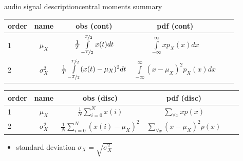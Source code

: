 \begin{frame}{audio signal description}{central moments summary}
\begin{footnotesize}
 \begin{table}
     \centering
         \begin{tabular}{lccccc}
             order & name & obs (cont) & pdf (cont) & \\\hline
            1 & $\mu_X$ & $\frac{1}{T}\int\limits_{-\nicefrac{T}{2}}^{\nicefrac{T}{2}} x(t)dt$ & $\int\limits_{-\infty}^{\infty}{xp_X(x)dx}$  \\
            2 & $\sigma_X^2$ & $\frac{1}{T}\int\limits_{-\nicefrac{T}{2}}^{\nicefrac{T}{2}}(x(t)-\mu_X)^2dt$ & $\int\limits_{-\infty}^{\infty} (x-\mu_X)^2p_X(x)dx$  \\
         \end{tabular}
 \end{table}
 \begin{table}
     \centering
         \begin{tabular}{lccccc}
             order & name  & obs (disc) & pdf (disc)\\\hline
            1 & $\mu_X$         &  $\frac{1}{N}\sum\limits_{i=0}^{N} x(i)$              & $\sum\limits_{\forall x} x p(x)$ \\
            2 & $\sigma_X^2$    &  $\frac{1}{N}\sum\limits_{i=0}^{N} (x(i)-\mu_X)^2$    & $\sum\limits_{\forall x} (x-\mu_X)^2p(x)$ \\
         \end{tabular}
 \end{table}
\end{footnotesize}
    \begin{itemize}
        \item[] standard deviation $\sigma_X = \sqrt{\sigma_X^2}$
    \end{itemize}
\end{frame}		

